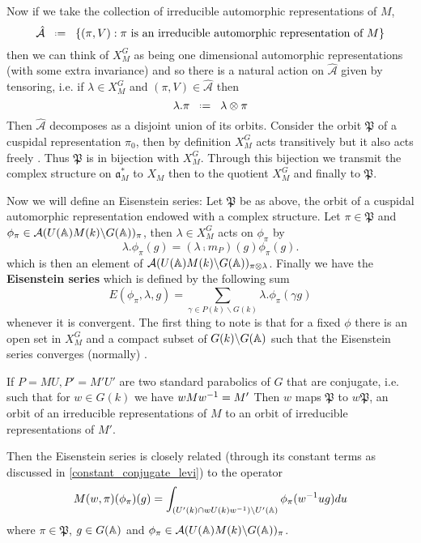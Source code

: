 Now if we take the collection of irreducible automorphic representations of \(M\),
 \[\hat{\mathcal{A}} \defeq \{(\pi, V) : \pi \text{ is an irreducible automorphic representation of }M\}\]
then we can think of \(X_M^G\) as being one dimensional automorphic representations (with some extra invariance) and so there is a natural action on \(\hat{\mathcal{A}}\) given by tensoring, i.e. if \(\lambda\in X_M^G\) and \((\pi, V)\in \hat{\mathcal{A}}\) then 
\[\lambda.\pi \defeq \lambda\tensor \pi\]
Then \(\hat{\mathcal{A}}\) decomposes as a disjoint union of its orbits. Consider the orbit \(\mathfrak{P}\) of a cuspidal representation \(\pi_0\), then by definition \(X_M^G\) acts transitively but it also acts freely \cite[II.1]{moeglinSpectralDecompositionEisenstein1995}. Thus \(\mathfrak{P}\) is in bijection with \(X_M^G\). Through this bijection we transmit the complex structure on \(\mathfrak{a}_M^*\) to \(X_M\) then to the quotient \(X_M^G\) and finally to \(\mathfrak{P}\).

Now we will define an Eisenstein series: Let \(\mathfrak{P}\) be as above, the orbit of a cuspidal automorphic representation endowed with a complex structure. Let \(\pi\in \mathfrak{P}\) and \(\phi_\pi \in \mathcal{A}(U(\A)M(k)\backslash G(\A))_\pi\), then \(\lambda\in X_M^G\) acts on \(\phi_\pi\) by 
\[\lambda.\phi_\pi(g) = (\lambda \comp m_P)(g) \phi_\pi(g).\]
which is then an element of \(\mathcal{A}(U(\A)M(k)\backslash G(\A))_{\pi\tensor \lambda}\). Finally we have the \textbf{Eisenstein series} which is defined by the following sum
\[E(\phi_\pi, \lambda, g) = \sum_{\gamma \in P(k)\backslash G(k)} \lambda.\phi_\pi(\gamma g)\]
whenever it is convergent. The first thing to note is that for a fixed \(\phi\) there is an open set in \(X_M^G\) and a compact subset of \(G(k)\backslash G(\A)\) such that the Eisenstein series converges (normally) \cite[II.1.5]{moeglinSpectralDecompositionEisenstein1995}.

If \(P = MU, P' = M'U'\) are two standard parabolics of \(G\) that are conjugate, i.e. such that for \(w\in G(k)\) we have \(wMw^{-1} = M'\)
Then \(w\) maps \(\mathfrak{P}\) to \(w\mathfrak{P}\), an orbit of an irreducible representations of \(M\) to an orbit of irreducible representations of \(M'\).

Then the Eisenstein series is closely related (through its constant terms as discussed in \ref{constant_conjugate_levi}) to the operator
\[M(w, \pi)(\phi_\pi)(g) = \int_{(U'(k)\cap wU(k)w\inv )\backslash U'(\A)} \phi_\pi(w\inv ug) du\]
where \(\pi\in \mathfrak{P}\), \(g\in G(\A)\) and \(\phi_\pi \in \mathcal{A}(U(\A)M(k)\backslash G(\A))_\pi\).

